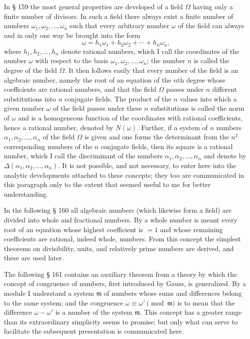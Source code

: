 \documentclass[11pt]{article}
\newcommand{\origpage}[1]{\par\vspace{0.25em}\noindent{\footnotesize\itshape [Printed page #1]}\par\vspace{0.25em}}
\newcommand{\ideal}[1]{\mathfrak{#1}}
\begin{document}
In § 159 the most general properties are developed of a field $\Omega$ having only a finite number of divisors. In such a field there always exist a finite number of numbers $\omega_1,\omega_2,\ldots,\omega_n$ such that every arbitrary number $\omega$ of the field can always and in only one way be brought into the form
\[
\omega=h_1\omega_1+h_2\omega_2+\cdots+h_n\omega_n,
\]
where $h_1,h_2,\ldots,h_n$ denote rational numbers, which I call the coordinates of the number $\omega$ with respect to the basis $\omega_1,\omega_2,\ldots,\omega_n$; the number $n$ is called the degree of the field $\Omega$. It then follows easily that every number of the field is an algebraic number, namely the root of an equation of the $n$th degree whose coefficients are rational numbers, and that the field $\Omega$ passes under $n$ different substitutions into $n$ conjugate fields. The product of the $n$ values into which a given number $\omega$ of the field passes under these $n$ substitutions is called the norm of $\omega$ and is a homogeneous function of the coordinates with rational coefficients, hence a rational number, denoted by $N(\omega)$. Further, if a system of $n$ numbers $\alpha_1,\alpha_2,\ldots,\alpha_n$ of the field $\Omega$ is given and one forms the determinant from the $n^2$ corresponding numbers of the $n$ conjugate fields, then its square is a rational number, which I call the discriminant of the numbers $\alpha_1,\alpha_2,\ldots,\alpha_n$ and denote by $\Delta(\alpha_1,\alpha_2,\ldots,\alpha_n)$. It is not possible, and not necessary, to enter here into the analytic developments attached to these concepts; they too are communicated in this paragraph only to the extent that seemed useful to me for better understanding.

\origpage{402}
In the following § 160 all algebraic numbers (which likewise form a field) are divided into whole and fractional numbers. By a whole number is meant every root of an equation whose highest coefficient is $=1$ and whose remaining coefficients are rational, indeed whole, numbers. From this concept the simplest theorems on divisibility, units, and relatively prime numbers are derived, and these are used later.

The following § 161 contains an auxiliary theorem from a theory by which the concept of congruence of numbers, first introduced by Gauss, is generalized. By a module I understand a system $\ideal{m}$ of numbers whose sums and differences belong to the same system; and the congruence $\omega\equiv\omega'\pmod{\ideal{m}}$ is to mean that the difference $\omega-\omega'$ is a number of the system $\ideal{m}$. This concept has a greater range than its extraordinary simplicity seems to promise; but only what can serve to facilitate the subsequent presentation is communicated here.
\end{document}
